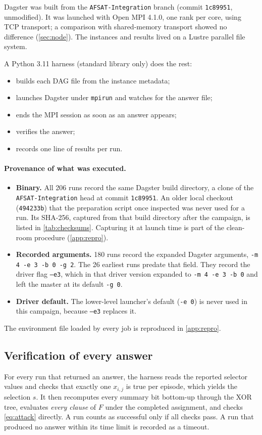 \documentclass[11pt,a4paper]{article}
\newcommand{\opt}[1]{\texttt{#1}}
\begin{document}
Dagster was built from the \texttt{AFSAT-Integration} branch (commit \texttt{1c89951},
unmodified). It was launched with Open MPI 4.1.0, one rank per core, using TCP
transport; a comparison with shared-memory transport showed no
difference (\cref{sec:node}). The instances and results lived on a Lustre parallel file
system.

A Python 3.11 harness (standard library only) does the rest:
\begin{itemize}
\item builds each DAG file from the instance metadata;
\item launches Dagster under \texttt{mpirun} and watches for the answer file;
\item ends the MPI session as soon as an answer appears;
\item verifies the answer;
\item records one line of results per run.
\end{itemize}

\paragraph{Provenance of what was executed.}
\begin{itemize}
\item \textbf{Binary.} All 206 runs record the same Dagster build directory, a clone of the
      \texttt{AFSAT-Integration} head at commit \texttt{1c89951}. An older local checkout
      (\texttt{494233b}) that the preparation script once inspected was never used for a
      run. Its SHA-256, captured from that build directory after the campaign, is listed in
      \cref{tab:checksums}. Capturing it at launch time is part of the clean-room procedure
      (\cref{app:repro}).
\item \textbf{Recorded arguments.} 180 runs record the expanded Dagster arguments,
      \opt{-m 4 -e 3 -b 0 -g 2}. The 26 earliest runs predate that field. They record the
      driver flag \opt{--e3}, which in that driver version expanded to
      \opt{-m 4 -e 3 -b 0} and left the master at its default \opt{-g 0}.
\item \textbf{Driver default.} The lower-level launcher's default (\opt{-e 0}) is never used
      in this campaign, because \opt{--e3} replaces it.
\end{itemize}
The environment file loaded by every job is reproduced in \cref{app:repro}.

\subsection{Verification of every answer}
\label{sec:verification}
For every run that returned an answer, the harness reads the reported selector values and
checks that exactly one $x_{i,j}$ is true per episode, which yields the selection $s$. It
then recomputes every summary bit bottom-up through the XOR tree, evaluates \emph{every
clause} of $F$ under the completed assignment, and checks \cref{eq:attack} directly. A run
counts as successful only if all checks pass. A run that produced no answer within its time
limit is recorded as a timeout.
\end{document}
